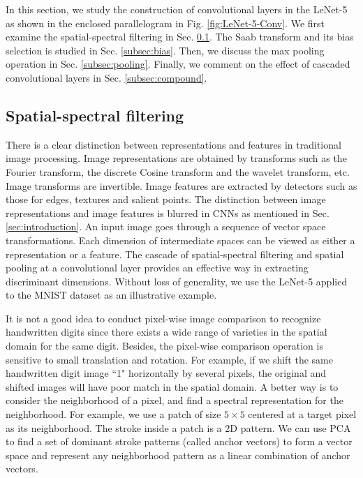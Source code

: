 \documentclass[preprint,12pt]{elsarticle}
\begin{document}
In this section, we study the construction of convolutional layers in
the LeNet-5 as shown in the enclosed parallelogram in Fig.
\ref{fig:LeNet-5-Conv}. We first examine the spatial-spectral filtering
in Sec. \ref{subsec:filtering}. The Saab transform and its bias
selection is studied in Sec. \ref{subsec:bias}. Then, we discuss the max
pooling operation in Sec. \ref{subsec:pooling}.  Finally, we comment on
the effect of cascaded convolutional layers in Sec.
\ref{subsec:compound}. 

\subsection{Spatial-spectral filtering}\label{subsec:filtering}

There is a clear distinction between representations and features in
traditional image processing. Image representations are obtained by
transforms such as the Fourier transform, the discrete Cosine transform
and the wavelet transform, etc. Image transforms are invertible.  Image
features are extracted by detectors such as those for edges, textures
and salient points. The distinction between image representations and
image features is blurred in CNNs as mentioned in Sec.
\ref{sec:introduction}. An input image goes through a sequence of vector
space transformations. Each dimension of intermediate spaces can be
viewed as either a representation or a feature.  The cascade of
spatial-spectral filtering and spatial pooling at a convolutional layer
provides an effective way in extracting discriminant dimensions.
Without loss of generality, we use the LeNet-5 applied to the MNIST
dataset as an illustrative example. 

It is not a good idea to conduct pixel-wise image comparison to
recognize handwritten digits since there exists a wide range of
varieties in the spatial domain for the same digit. Besides, the
pixel-wise comparison operation is sensitive to small translation and
rotation. For example, if we shift the same handwritten digit image ``1"
horizontally by several pixels, the original and shifted images will
have poor match in the spatial domain. A better way is to consider the
neighborhood of a pixel, and find a spectral representation for the
neighborhood.  For example, we use a patch of size $5 \times 5$ centered
at a target pixel as its neighborhood. The stroke inside a patch is a 2D
pattern. We can use PCA to find a set of dominant stroke patterns
(called anchor vectors) to form a vector space and represent any
neighborhood pattern as a linear combination of anchor vectors. 
\end{document}
